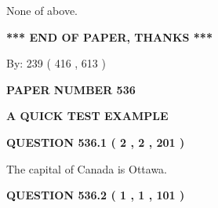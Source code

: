 \documentclass[12pt]{article}
\begin{document}
  
 
 
\noindent{}
 
 
 None of above.
 
 
 
 
   
   
 \vspace{0.2in}
 
   
   
   
   
\vspace{1.0in} 
{\textbf{\large{ *** END OF PAPER, THANKS *** }}} 
   
   
\hspace{1.0in} By: 
 239 ( 416 ,  613 )
   
   
   
   
\newpage 
\setcounter{page}{ 
   536001 } 
   
   
   
   
 {\textbf{ \Large{ PAPER NUMBER  536  }}}
   
   
\vspace{0.2in}
   
   
   
   
   
   
 \vspace{0.2in}
{\LARGE {\textbf{ A QUICK TEST EXAMPLE}}}
   
   
  
\vspace{0.2in}
  
{\textbf{\Large{QUESTION
536.1 
 ( 2 , 2 , 201 )
}}}
  
  
 
 
\noindent{}
 
 
The capital of Canada is Ottawa.
 
 
 
 
  
\vspace{0.2in}
  
{\textbf{\Large{QUESTION
536.2 
 ( 1 , 1 , 101 )
}}}
  
  
 
 
\noindent{}
\end{document}
